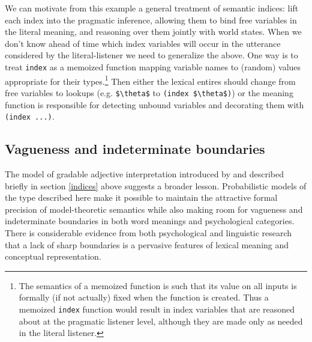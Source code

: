 \documentclass[pdfextras]{handbook}
\begin{document}
We can motivate from this example a general treatment of semantic indices: lift each index into the pragmatic inference, allowing them to bind free variables in the literal meaning, and reasoning over them jointly with world states. 
When we don't know ahead of time which index variables will occur in the utterance considered by the literal-listener we need to generalize the above. 
One way is to treat \lstinline{index} as a memoized function mapping variable names to (random) values appropriate for their types.\footnote{The semantics of a memoized function is such that its value on all inputs is formally (if not actually) fixed when the function is created. Thus a memoized \lstinline{index} function would result in index variables that are reasoned about at the pragmatic listener level, although they are made only as needed in the literal listener.} 
Then either the lexical entires should change from free variables to lookups (e.g. \lstinline[mathescape]{$\theta$} to \lstinline[mathescape]{(index $\theta$)}) or the meaning function is responsible for detecting unbound variables and decorating them with \lstinline[mathescape]{(index ...)}.

\subsection{\label{vagueness}Vagueness and indeterminate boundaries}
The model of gradable adjective interpretation introduced by \citet{lassitergoodman13} and described briefly in section \ref{indices} above suggests a broader lesson. 
Probabilistic models of the type described here make it possible to maintain the attractive formal precision of model-theoretic semantics while also making room for vagueness and indeterminate boundaries in both word meanings and psychological categories. 
There is considerable evidence from both psychological \citep[e.g.][]{rosch78,murphy02,hampton07} and linguistic \citep{taylor2003linguistic} research that a lack of sharp boundaries is a pervasive features of lexical meaning and conceptual representation. 
\end{document}
